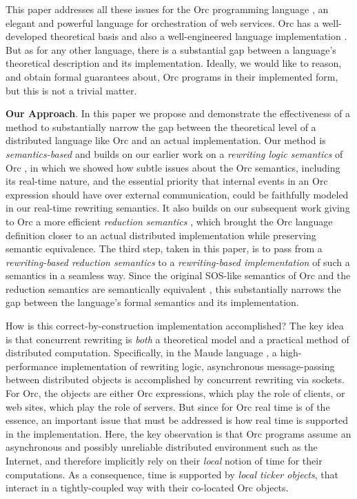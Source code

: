 \documentclass{eptcs}
\begin{document}
This paper addresses all these issues for the Orc programming language
\cite{OrcTheory05}, an elegant and powerful language for orchestration of web
services.  Orc has a well-developed theoretical basis \cite{OrcTheory05,OrcTreeSem05,OrcTraceSem06,WSFM07,Wehrman07tcs} and also a
well-engineered language implementation \cite{KitchinQCM09forte,OrcJavaImp05}.  But as for any other
language, there is a substantial gap between a language's
theoretical description and its implementation.  Ideally, we would
like to reason, and obtain formal guarantees about, Orc programs in
their implemented form, but this is not a trivial matter.

{\bf Our Approach}.  In this paper we propose and demonstrate the
effectiveness of a method to substantially narrow the gap between the
theoretical level of a distributed language like Orc and an actual
implementation.  Our method is \emph{semantics-based} and builds on
our earlier work on a \emph{rewriting logic semantics} of Orc
\cite{AlTurkiM07PPDP}, in which we showed how subtle issues about the
Orc semantics, including its real-time nature, and the essential
priority that internal events in an Orc expression should have over
external communication, could be faithfully modeled in our real-time rewriting
semantics.  It also builds on our subsequent work giving to Orc a more
efficient \emph{reduction semantics}
\cite{AlTurkiM07WWV,AlTurkiM07tr}, which brought the Orc language
definition closer to an actual distributed
implementation while preserving semantic equivalence.  The third step,
taken in this paper, is to pass from a \emph{rewriting-based reduction
  semantics} to a \emph{rewriting-based implementation} of such a
semantics in a seamless way.  Since the original SOS-like semantics of
Orc and the reduction semantics are semantically equivalent
\cite{AlTurkiM07tr}, this substantially narrows the gap between the
language's formal semantics and its implementation.

How is this correct-by-construction implementation accomplished?  The
key idea is that concurrent rewriting is \emph{both} a theoretical
model and a practical method of distributed computation.
Specifically, in the Maude language \cite{maude-book}, a high-performance
implementation of rewriting logic, asynchronous message-passing
between distributed objects is accomplished by
concurrent rewriting via sockets.  For Orc, the objects 
are either Orc expressions, which play the role of clients, or web
sites, which play the role of servers.  But since for Orc real time is
of the essence, an important issue that must be addressed is how real
time is supported in the implementation.  Here, the key observation is
that Orc programs assume an asynchronous and possibly unreliable
distributed environment such as the Internet, and therefore implicitly
rely on their \emph{local} notion of time for their computations.  As
a consequence, time is supported by \emph{local ticker objects}, that
interact in a tightly-coupled way with their co-located Orc
objects.
\end{document}
